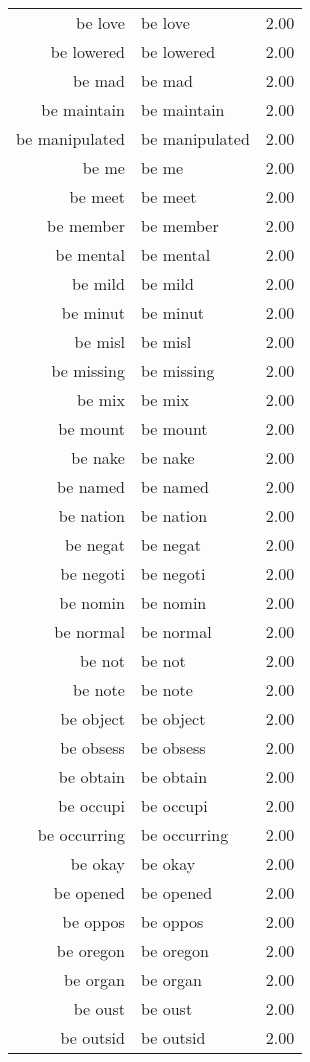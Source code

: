 \begin{table}[ht]
\begin{tabular}{rlr}
  be love & be love & 2.00 \\ 
  be lowered & be lowered & 2.00 \\ 
  be mad & be mad & 2.00 \\ 
  be maintain & be maintain & 2.00 \\ 
  be manipulated & be manipulated & 2.00 \\ 
  be me & be me & 2.00 \\ 
  be meet & be meet & 2.00 \\ 
  be member & be member & 2.00 \\ 
  be mental & be mental & 2.00 \\ 
  be mild & be mild & 2.00 \\ 
  be minut & be minut & 2.00 \\ 
  be misl & be misl & 2.00 \\ 
  be missing & be missing & 2.00 \\ 
  be mix & be mix & 2.00 \\ 
  be mount & be mount & 2.00 \\ 
  be nake & be nake & 2.00 \\ 
  be named & be named & 2.00 \\ 
  be nation & be nation & 2.00 \\ 
  be negat & be negat & 2.00 \\ 
  be negoti & be negoti & 2.00 \\ 
  be nomin & be nomin & 2.00 \\ 
  be normal & be normal & 2.00 \\ 
  be not & be not & 2.00 \\ 
  be note & be note & 2.00 \\ 
  be object & be object & 2.00 \\ 
  be obsess & be obsess & 2.00 \\ 
  be obtain & be obtain & 2.00 \\ 
  be occupi & be occupi & 2.00 \\ 
  be occurring & be occurring & 2.00 \\ 
  be okay & be okay & 2.00 \\ 
  be opened & be opened & 2.00 \\ 
  be oppos & be oppos & 2.00 \\ 
  be oregon & be oregon & 2.00 \\ 
  be organ & be organ & 2.00 \\ 
  be oust & be oust & 2.00 \\ 
  be outsid & be outsid & 2.00 \\ 

\end{tabular}
\end{table}
